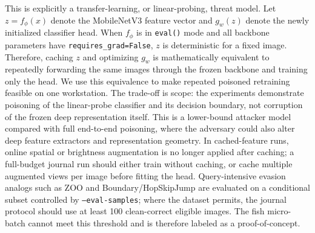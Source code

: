 \documentclass[conference]{IEEEtran}
\begin{document}
This is explicitly a transfer-learning, or linear-probing, threat model. Let \(z=f_\phi(x)\) denote the MobileNetV3 feature vector and \(g_w(z)\) denote the newly initialized classifier head. When \(f_\phi\) is in \texttt{eval()} mode and all backbone parameters have \texttt{requires\_grad=False}, \(z\) is deterministic for a fixed image. Therefore, caching \(z\) and optimizing \(g_w\) is mathematically equivalent to repeatedly forwarding the same images through the frozen backbone and training only the head. We use this equivalence to make repeated poisoned retraining feasible on one workstation. The trade-off is scope: the experiments demonstrate poisoning of the linear-probe classifier and its decision boundary, not corruption of the frozen deep representation itself. This is a lower-bound attacker model compared with full end-to-end poisoning, where the adversary could also alter deep feature extractors and representation geometry. In cached-feature runs, online spatial or brightness augmentation is no longer applied after caching; a full-budget journal run should either train without caching, or cache multiple augmented views per image before fitting the head. Query-intensive evasion analogs such as ZOO and Boundary/HopSkipJump are evaluated on a conditional subset controlled by \texttt{--eval-samples}; where the dataset permits, the journal protocol should use at least 100 clean-correct eligible images. The fish micro-batch cannot meet this threshold and is therefore labeled as a proof-of-concept.
\end{document}
